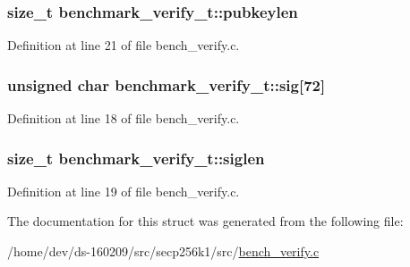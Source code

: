 \hypertarget{structbenchmark__verify__t_a49a11cf3776db6f6df107d4632da6627}{}
\subsubsection[{pubkeylen}]{\setlength{\rightskip}{0pt plus 5cm}size\+\_\+t benchmark\+\_\+verify\+\_\+t\+::pubkeylen}\label{structbenchmark__verify__t_a49a11cf3776db6f6df107d4632da6627}


Definition at line 21 of file bench\+\_\+verify.\+c.

\hypertarget{structbenchmark__verify__t_a3109a53e5491482e77df9039d3e01720}{}
\subsubsection[{sig}]{\setlength{\rightskip}{0pt plus 5cm}unsigned char benchmark\+\_\+verify\+\_\+t\+::sig\mbox{[}72\mbox{]}}\label{structbenchmark__verify__t_a3109a53e5491482e77df9039d3e01720}


Definition at line 18 of file bench\+\_\+verify.\+c.

\hypertarget{structbenchmark__verify__t_a75e2235d538ab592d540c45118218843}{}
\subsubsection[{siglen}]{\setlength{\rightskip}{0pt plus 5cm}size\+\_\+t benchmark\+\_\+verify\+\_\+t\+::siglen}\label{structbenchmark__verify__t_a75e2235d538ab592d540c45118218843}


Definition at line 19 of file bench\+\_\+verify.\+c.



The documentation for this struct was generated from the following file\+:\begin{DoxyCompactItemize}
\item 
/home/dev/ds-\/160209/src/secp256k1/src/\hyperlink{bench__verify_8c}{bench\+\_\+verify.\+c}\end{DoxyCompactItemize}
